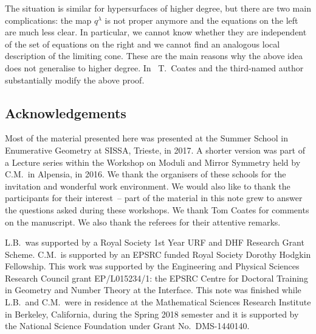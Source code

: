 \documentclass[pdftex]{sigma}
\numberwithin{equation}{section}
\begin{document}
\begin{Remark}
The situation is similar for hypersurfaces of higher degree, but there are two main complications: the map $q^{\lambda}$ is not proper anymore and the equations on the left are much less clear. In particular, we cannot know whether they are independent of the set of equations on the right and we cannot find an analogous local description of the limiting cone. These are the main reasons why the above idea does not generalise to higher degree. In~\cite{eu3} T.~Coates and the third-named author substantially modify the above proof.
\end{Remark}

\subsection*{Acknowledgements} Most of the material presented here was presented at the Summer School in Enumerative Geometry at SISSA, Trieste, in 2017. A shorter version was part of a Lecture series within the Workshop on Moduli and Mirror Symmetry held by C.M.\ in Alpensia, in 2016. We thank the organisers of these schools for the invitation and wonderful work environment. We would also like to thank the participants for their interest~-- part of the material in this note grew to answer the questions asked during these workshops. We thank Tom Coates for comments on the manuscript. We also thank the referees for their attentive remarks.

L.B.\ was supported by a Royal Society 1st Year URF and DHF Research Grant Scheme.
C.M.\ is supported by an EPSRC funded Royal Society Dorothy Hodgkin Fellowship.
This work was supported by the Engineering and Physical Sciences Research Council grant EP/L015234/1: the EPSRC Centre for Doctoral Training in Geometry and Number Theory at the Interface. This note was finished while L.B.\ and C.M.\ were in residence at the Mathematical Sciences Research Institute in Berkeley, California, during the Spring 2018 semester and it is supported by the National Science Foundation under Grant No.~DMS-1440140.
\end{document}
